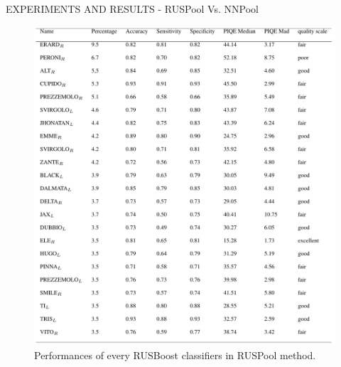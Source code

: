 \begin{frame}{EXPERIMENTS AND RESULTS - RUSPool Vs. NNPool}
    \begin{minipage}{\linewidth}
        \centering
        \begin{minipage}{0.45\linewidth}
            \begin{figure}[h!]
                \centering
                \includegraphics[width = \linewidth]{images/paper10/RUSBoost performance.png}
                \centering
                \caption{Performances of every RUSBoost classifiers in RUSPool method.}
                \label{fig: RUSBoostPerf}
            \end{figure}
        \end{minipage}
        \hspace{0.05\linewidth}
        \begin{minipage}{0.45\linewidth}
            \begin{figure}[h!]
                \centering

\end{figure}
\end{minipage}
\end{minipage}
\end{frame}
